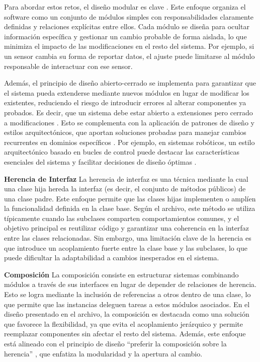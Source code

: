 Para abordar estos retos, el diseño modular es clave \cite{Parnas1972}. Este enfoque organiza el software como un conjunto de módulos simples con responsabilidades claramente definidas y relaciones explícitas entre ellos. Cada módulo se diseña para ocultar información específica y gestionar un cambio probable de forma aislada, lo que minimiza el impacto de las modificaciones en el resto del sistema. Por ejemplo, si un sensor cambia su forma de reportar datos, el ajuste puede limitarse al módulo responsable de interactuar con ese sensor.

Además, el principio de diseño abierto-cerrado \cite{DBLP:books/ph/Meyer97} se implementa para garantizar que el sistema pueda extenderse mediante nuevos módulos en lugar de modificar los existentes, reduciendo el riesgo de introducir errores al alterar componentes ya probados. Es decir, que un sistema debe estar abierto a extensiones pero cerrado a modificaciones \cite{DBLP:books/ph/Meyer97}. Esto se complementa con la aplicación de patrones de diseño y estilos arquitectónicos, que aportan soluciones probadas para manejar cambios recurrentes en dominios específicos \cite{Gamma:1995:DPE:186897, DBLP:books/lib/BuschmannHS07}. Por ejemplo, en sistemas robóticos, un estilo arquitectónico basado en bucles de control puede destacar las características esenciales del sistema y facilitar decisiones de diseño óptimas \cite{ShawGarlan1996}.

\textbf{Herencia de Interfaz}
La herencia de interfaz es una técnica mediante la cual una clase hija hereda la interfaz (es decir, el conjunto de métodos públicos) de una clase padre. Este enfoque permite que las clases hijas implementen o amplíen la funcionalidad definida en la clase base. Según el archivo, este método se utiliza típicamente cuando las subclases comparten comportamientos comunes, y el objetivo principal es reutilizar código y garantizar una coherencia en la interfaz entre las clases relacionadas. Sin embargo, una limitación clave de la herencia es que introduce un acoplamiento fuerte entre la clase base y las subclases, lo que puede dificultar la adaptabilidad a cambios inesperados en el sistema.

\textbf{Composición}
La composición consiste en estructurar sistemas combinando módulos a través de sus interfaces en lugar de depender de relaciones de herencia. Esto se logra mediante la inclusión de referencias a otros dentro de una clase, lo que permite que las instancias deleguen tareas a estos módulos asociados. En el diseño presentado en el archivo, la composición es destacada como una solución que favorece la flexibilidad, ya que evita el acoplamiento jerárquico y permite reemplazar componentes sin afectar el resto del sistema. Además, este enfoque está alineado con el principio de diseño ``preferir la composición sobre la herencia'' \cite{Gamma:1995:DPE:186897}, que enfatiza la modularidad y la apertura al cambio.



